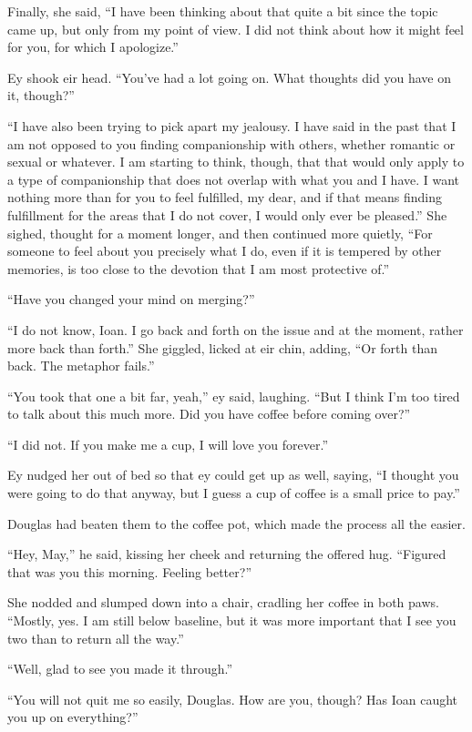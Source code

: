 Finally, she said, ``I have been thinking about that quite a bit since the topic came up, but only from my point of view. I did not think about how it might feel for you, for which I apologize.''

Ey shook eir head. ``You've had a lot going on. What thoughts did you have on it, though?''

``I have also been trying to pick apart my jealousy. I have said in the past that I am not opposed to you finding companionship with others, whether romantic or sexual or whatever. I am starting to think, though, that that would only apply to a type of companionship that does not overlap with what you and I have. I want nothing more than for you to feel fulfilled, my dear, and if that means finding fulfillment for the areas that I do not cover, I would only ever be pleased.'' She sighed, thought for a moment longer, and then continued more quietly, ``For someone to feel about you precisely what I do, even if it is tempered by other memories, is too close to the devotion that I am most protective of.''

``Have you changed your mind on merging?''

``I do not know, Ioan. I go back and forth on the issue and at the moment, rather more back than forth.'' She giggled, licked at eir chin, adding, ``Or forth than back. The metaphor fails.''

``You took that one a bit far, yeah,'' ey said, laughing. ``But I think I'm too tired to talk about this much more. Did you have coffee before coming over?''

``I did not. If you make me a cup, I will love you forever.''

Ey nudged her out of bed so that ey could get up as well, saying, ``I thought you were going to do that anyway, but I guess a cup of coffee is a small price to pay.''

Douglas had beaten them to the coffee pot, which made the process all the easier.

``Hey, May,'' he said, kissing her cheek and returning the offered hug. ``Figured that was you this morning. Feeling better?''

She nodded and slumped down into a chair, cradling her coffee in both paws. ``Mostly, yes. I am still below baseline, but it was more important that I see you two than to return all the way.''

``Well, glad to see you made it through.''

``You will not quit me so easily, Douglas. How are you, though? Has Ioan caught you up on everything?''

